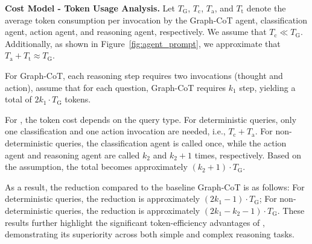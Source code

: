 


\textbf{Cost Model - Token Usage Analysis.} 
Let \( T_{\text{G}} \), \( T_{\text{c}} \), \( T_{\text{a}} \), and \( T_{\text{t}} \) denote the average token consumption per invocation by the Graph-CoT agent, classification agent, action agent, and reasoning agent, respectively. We assume that \( T_{\text{c}} \ll T_{\text{G}} \). Additionally, as shown in Figure~\ref{fig:agent_prompt}, we approximate that \( T_{\text{a}} + T_{\text{t}} \approx T_{\text{G}} \).

For Graph-CoT, each reasoning step requires two invocations (thought and action), assume that for each question, Graph-CoT requires $k_1$ step, yielding a total of \( 2k_1 \cdot T_{\text{G}} \) tokens.

For \projectname, the token cost depends on the query type. For deterministic queries, only one classification and one action invocation are needed, i.e., \( T_{\text{c}} + T_{\text{a}} \). For non-deterministic queries, the classification agent is called once, while the action agent and reasoning agent are called \( k_2 \) and \( k_2 + 1 \) times, respectively. Based on the assumption, the total becomes approximately \( (k_2 + 1) \cdot T_{\text{G}} \).

As a result, the reduction compared to the baseline Graph-CoT is as follows:  
For deterministic queries, the reduction is approximately \( (2k_1 - 1) \cdot T_{\text{G}} \);  
For non-deterministic queries, the reduction is approximately \( (2k_1 - k_2 - 1) \cdot T_{\text{G}} \).  
These results further highlight the significant token-efficiency advantages of \projectname, demonstrating its superiority across both simple and complex reasoning tasks.

